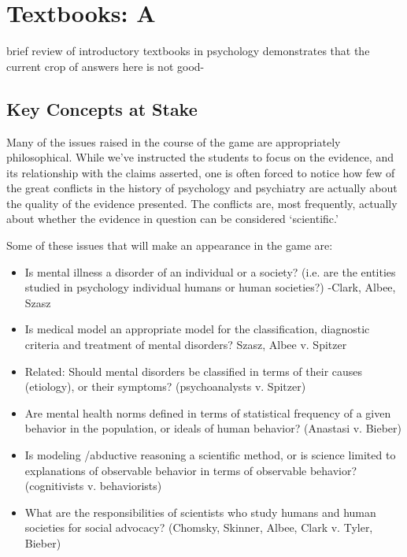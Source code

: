 \section{Textbooks: A}
\label{textbooks:a}

brief review of introductory textbooks in psychology demonstrates that the current crop of answers here is not good-

\subsection{Key Concepts at Stake}
\label{keyconceptsatstake}

Many of the issues raised in the course of the game are appropriately philosophical. While we've instructed the students to focus on the evidence, and its relationship with the claims asserted, one is often forced to notice how few of the great conflicts in the history of psychology and psychiatry are actually about the quality of the evidence presented. The conflicts are, most frequently, actually about whether the evidence in question can be considered `scientific.' 

Some of these issues that will make an appearance in the game are:

\begin{itemize}
\item Is mental illness a disorder of an individual or a society? (i.e. are the entities studied in psychology individual humans or human societies?) -Clark, Albee, Szasz

\item Is medical model an appropriate model for the classification, diagnostic criteria and treatment of mental disorders? Szasz, Albee v. Spitzer

\item Related: Should mental disorders be classified in terms of their causes (etiology), or their symptoms? (psychoanalysts v. Spitzer)

\item Are mental health norms defined in terms of statistical frequency of a given behavior in the population, or ideals of human behavior? (Anastasi v. Bieber)

\item Is modeling \slash  abductive reasoning a scientific method, or is science limited to explanations of observable behavior in terms of observable behavior? (cognitivists v. behaviorists)

\item What are the responsibilities of scientists who study humans and human societies for social advocacy? (Chomsky, Skinner, Albee, Clark v. Tyler, Bieber)

\end{itemize}


